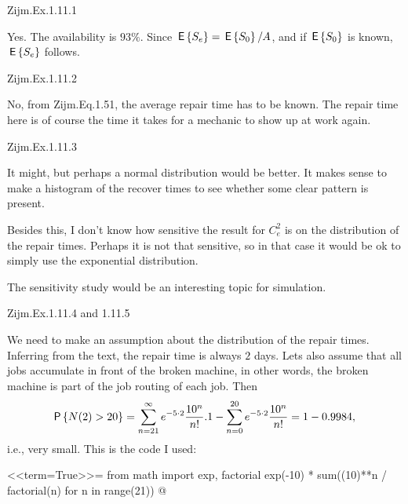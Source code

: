 \begin{exercise}
Zijm.Ex.1.11.1
 \begin{solution}
Yes. The availability is $93\%$. Since $\,\mathsf{E}\left\{S_e\right\} = \,\mathsf{E}\left\{S_0\right\}/A$, and if $\,\mathsf{E}\left\{S_0\right\} $ is known, $\,\mathsf{E}\left\{S_e\right\}$ follows.
\end{solution}
\end{exercise}

\begin{exercise}
Zijm.Ex.1.11.2
 \begin{solution}
   No, from Zijm.Eq.1.51, the average repair time has to be known. The
   repair time here is of course the time it takes for a mechanic to
   show up at work again.
\end{solution}
\end{exercise}
\begin{exercise}
Zijm.Ex.1.11.3
 \begin{solution}
   It might, but perhaps a normal distribution would be better. It
   makes sense to make a histogram of the recover times to see whether
   some clear pattern is present. 

   Besides this, I don't know how sensitive the result for $C_e^2$ is
   on the distribution of the repair times. Perhaps it is not that
   sensitive, so in that case it would be ok to simply use the
   exponential distribution. 

The sensitivity study would be an interesting topic for simulation. 
\end{solution}
\end{exercise}
\begin{exercise}
Zijm.Ex.1.11.4 and 1.11.5
 \begin{solution}
   We need to make an assumption about the distribution of the repair
   times. Inferring from the text, the repair time is always $2$
   days. Lets also assume that all jobs accumulate in front of the
   broken machine, in other words, the broken machine is part of the
   job routing of each job. Then
   \begin{equation*}
     \P{N(2) > 20} = 
\sum_{n=21}^\infty e^{-5\cdot 2} \frac{10^n}{n!}.
1  - \sum_{n=0}^{20} e^{-5\cdot 2} \frac{10^n}{n!} = 1-0.9984,
   \end{equation*}
i.e., very small.  This is the code I used: 

<<term=True>>=
from math import exp, factorial
exp(-10) * sum((10)**n / factorial(n) for n in range(21))
@
\end{solution}
\end{exercise}

